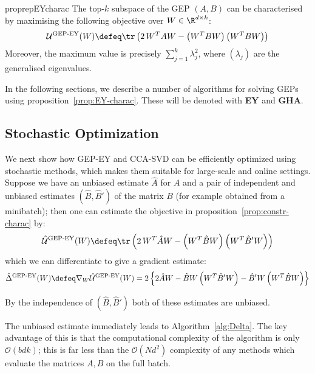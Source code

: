 \begin{restatable}{proprep}{EYcharac}
    \label{prop:EY-charac}
    The top-$k$ subspace of the GEP $(A,B)$ can be characterised by maximising the following objective over $W \in \R^{d \times k}$:
    \begin{align}
        \mathcal{U}^\text{GEP-EY}(W) \defeq \tr \left( 2\, W^T A W - \left(W^T B W\right) \left(W^T B W\right) \right)
    \end{align}
    Moreover, the maximum value is precisely $\sum_{j=1}^k \lambda_j^2$, where $(\lambda_j)$ are the generalised eigenvalues.
\end{restatable}

In the following sections, we describe a number of algorithms for solving GEPs using proposition~\ref{prop:EY-charac}.
These will be denoted with \textbf{EY} and \textbf{GHA}.

\subsection{Stochastic Optimization}

We next show how GEP-EY and CCA-SVD can be efficiently optimized using stochastic methods, which makes them suitable for large-scale and online settings.
Suppose we have an unbiased estimate $\hat{A}$ for $A$ and a pair of independent and unbiased estimates $(\hat{B},\hat{B}')$ of the matrix $B$ (for example obtained from a minibatch); then one can estimate the objective in proposition~\ref{prop:constr-charac} by:
\begin{align}
    \hat{\mathcal{U}}^\text{GEP-EY}(W) \defeq \tr \left( 2\, W^T \hat{A} W - \left(W^T \hat{B} W\right) \left(W^T \hat{B}' W\right) \right)
\end{align}
which we can differentiate to give a gradient estimate:
\begin{align}\label{eq:GEP-EY-grad}
    \hat{\Delta}^{\text{GEP-EY}}(W)
    \defeq \nabla_W \hat{\mathcal{U}}^\text{GEP-EY}(W)
    = 2 \left\{ 2 \hat{A} W - \hat{B} W \left(W^T \hat{B}' W \right) - \hat{B}' W \left(W^T \hat{B} W \right) \right\}
\end{align}

By the independence of $(\hat{B},\hat{B}')$ both of these estimates are unbiased.

The unbiased estimate immediately leads to Algorithm~\ref{alg:Delta}.
The key advantage of this is that the computational complexity of the algorithm is only $\mathcal{O}(b d k)$; this is far less than the $\mathcal{O}(N d^2)$ complexity of any methods which evaluate the matrices $A,B$ on the full batch.

